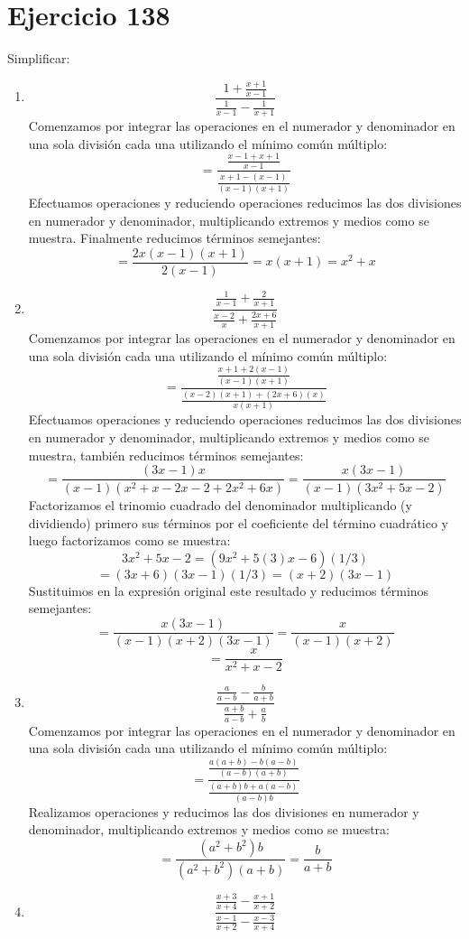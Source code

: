 \documentclass[12pt]{article}
\begin{document}
\section*{Ejercicio 138}
Simplificar:
\begin{enumerate}[label=\bfseries Ejercicio \arabic*:]
  \item $$\frac{1 + \frac{x + 1}{x - 1}}{\frac{1}{x - 1} - \frac{1}{x + 1}}$$
Comenzamos por integrar las operaciones en el numerador y denominador en una sola división cada una utilizando el mínimo común múltiplo:
$$= \frac{\frac{x - 1 + x + 1}{x - 1}}{\frac{x + 1 - (x - 1)}{(x - 1)(x + 1)}}$$
Efectuamos operaciones y reduciendo operaciones reducimos las dos divisiones en numerador y denominador, multiplicando extremos y medios como se muestra. Finalmente reducimos términos semejantes:
$$= \frac{2x(x - 1)(x + 1)}{2(x-1)} = x(x + 1) = x ^2 + x$$
  \item $$\frac{\frac{1}{x - 1} + \frac{2}{x + 1}}{\frac{x - 2}{x} + \frac{2x + 6 }{x + 1}}$$
Comenzamos por integrar las operaciones en el numerador y denominador en una sola división cada una utilizando el mínimo común múltiplo:
$$= \frac{\frac{x + 1 + 2(x -1)}{(x - 1)(x + 1)}}{\frac{(x - 2)(x + 1)+ (2x + 6)(x)}{x(x + 1)}}$$
Efectuamos operaciones y reduciendo operaciones reducimos las dos divisiones en numerador y denominador, multiplicando extremos y medios como se muestra, también reducimos términos semejantes:
$$= \frac{(3x - 1)x}{(x - 1)(x^2 + x - 2x -2 + 2x^2 + 6x)} = \frac{x(3x - 1)}{(x - 1)(3x^2 + 5x - 2)}$$
Factorizamos el trinomio cuadrado del denominador multiplicando (y dividiendo) primero sus términos por el coeficiente del término cuadrático y luego factorizamos como se muestra:
$$3x^2 + 5x - 2 = (9x^2 + 5(3)x - 6)(1/3)$$
$$= (3x + 6)(3x - 1)(1/3) = (x + 2)(3x - 1)$$
Sustituimos en la expresión original este resultado y reducimos términos semejantes:
$$= \frac{x(3x - 1)}{(x - 1)(x + 2)(3x - 1)} = \frac{x}{(x - 1)(x + 2)}$$
$$= \frac{x}{x^2 + x - 2}$$
  \item $$\frac{\frac{a}{a - b} - \frac{b}{a + b}}{\frac{a + b}{a - b} + \frac{a}{b}}$$
Comenzamos por integrar las operaciones en el numerador y denominador en una sola división cada una utilizando el mínimo común múltiplo:
$$= \frac{\frac{a(a + b) - b(a - b)}{(a - b)(a + b)}}{\frac{(a + b)b + a(a - b)}{(a - b)b}}$$
Realizamos operaciones y reducimos las dos divisiones en numerador y denominador, multiplicando extremos y medios como se muestra:
$$= \frac{(a^2 + b^2)b}{(a^2 + b^2)(a + b)} = \frac{b}{a + b}$$
  \item $$\frac{\frac{x + 3}{x + 4} - \frac{x + 1}{x + 2}}{\frac{x - 1}{x + 2} - \frac{x - 3}{x + 4}}$$

\end{enumerate}
\end{document}
